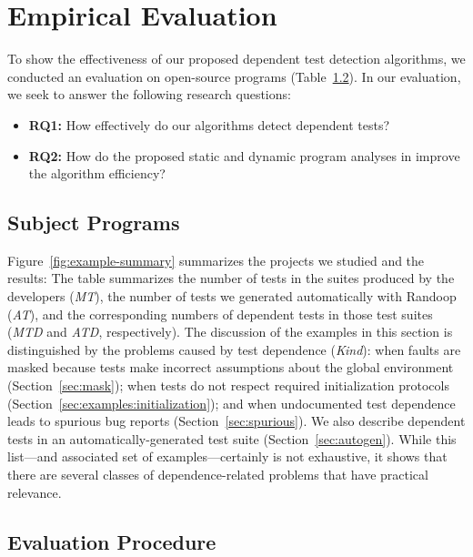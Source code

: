 \section{Empirical Evaluation}
\label{sec:evaluation}

To show the effectiveness of our proposed
dependent test detection algorithms, we conducted
an evaluation on  open-source programs (Table~\ref{}).
In our evaluation, we seek to answer the following research questions:

\begin{itemize}
\item \textbf{RQ1:} How effectively do our algorithms detect
dependent tests?
\item \textbf{RQ2:} How do the proposed static and dynamic program analyses
in  improve the algorithm efficiency?
\end{itemize}

\subsection{Subject Programs}




Figure~\ref{fig:example-summary}
summarizes the projects we studied and the results: The table
summarizes the number of tests in the suites produced by the
developers (\emph{MT}), the number of tests we generated automatically
with Randoop (\emph{AT}), and the corresponding numbers of dependent
tests in those test suites (\emph{MTD} and \emph{ATD}, respectively). 
The discussion of the examples in this section is distinguished by
the problems caused by test dependence (\emph{Kind}): when faults are masked because
tests make incorrect assumptions about the global environment (Section~\ref{sec:mask}); 
when tests do not
respect required initialization protocols (Section~\ref{sec:examples:initialization}); and when
undocumented test dependence leads to spurious bug reports (Section~\ref{sec:spurious}).
We also describe dependent tests in an automatically-generated test
suite (Section~\ref{sec:autogen}).
While this list---and associated set of examples---certainly is not exhaustive, it shows that there are
several classes of dependence-related problems that have practical
relevance.


\subsection{Evaluation Procedure}

